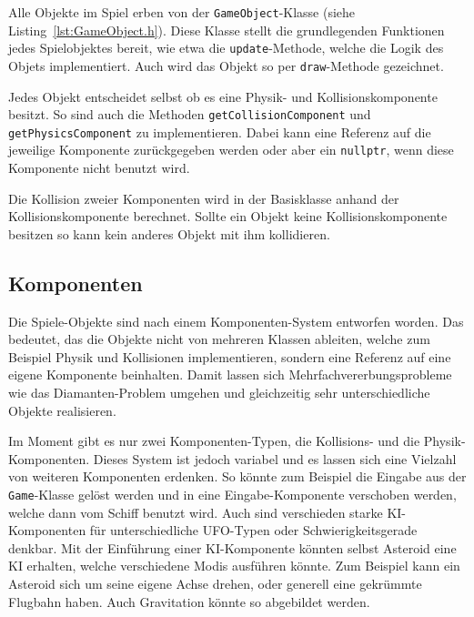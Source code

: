 \documentclass[12pt, a4paper, titlepage, hidelinks]{scrreprt}
\begin{document}
Alle Objekte im Spiel erben von der \texttt{GameObject}-Klasse (siehe Listing~\autoref{lst:GameObject.h}). Diese Klasse stellt die grundlegenden Funktionen jedes Spielobjektes bereit, wie etwa die \texttt{update}-Methode, welche die Logik des Objets implementiert. Auch wird das Objekt so per \texttt{draw}-Methode gezeichnet.

Jedes Objekt entscheidet selbst ob es eine Physik- und Kollisionskomponente besitzt. So sind auch die Methoden \texttt{getCollisionComponent} und \texttt{getPhysicsComponent} zu implementieren. Dabei kann eine Referenz auf die jeweilige Komponente zurückgegeben werden oder aber ein \texttt{nullptr}, wenn diese Komponente nicht benutzt wird.

Die Kollision zweier Komponenten wird in der Basisklasse anhand der Kollisionskomponente berechnet. Sollte ein Objekt keine Kollisionskomponente besitzen so kann kein anderes Objekt mit ihm kollidieren.


\subsection{Komponenten}

Die Spiele-Objekte sind nach einem Komponenten-System entworfen worden. Das bedeutet, das die Objekte nicht von mehreren Klassen ableiten, welche zum Beispiel Physik und Kollisionen implementieren, sondern eine Referenz auf eine eigene Komponente beinhalten. Damit lassen sich Mehrfachvererbungsprobleme wie das Diamanten-Problem umgehen und gleichzeitig sehr unterschiedliche Objekte realisieren.

Im Moment gibt es nur zwei Komponenten-Typen, die Kollisions- und die Physik-Komponenten. Dieses System ist jedoch variabel und es lassen sich eine Vielzahl von weiteren Komponenten erdenken. So könnte zum Beispiel die Eingabe aus der \texttt{Game}-Klasse gelöst werden und in eine Eingabe-Komponente verschoben werden, welche dann vom Schiff benutzt wird. Auch sind verschieden starke KI-Komponenten für unterschiedliche UFO-Typen oder Schwierigkeitsgerade denkbar. Mit der Einführung einer KI-Komponente könnten selbst Asteroid eine KI erhalten, welche verschiedene Modis ausführen könnte. Zum Beispiel kann ein Asteroid sich um seine eigene Achse drehen, oder generell eine gekrümmte Flugbahn haben. Auch Gravitation könnte so abgebildet werden.
\end{document}
